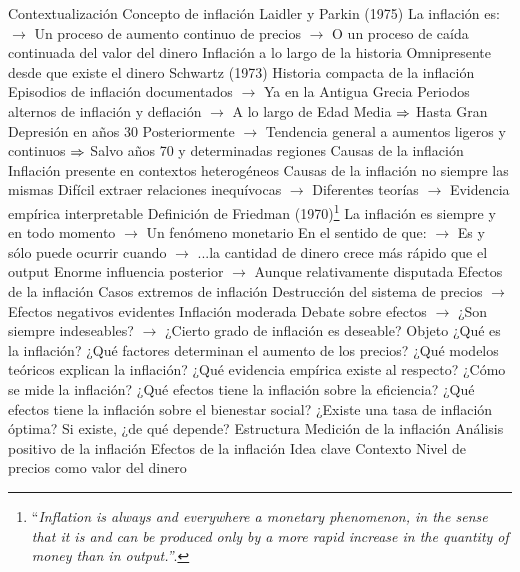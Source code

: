 \documentclass{nuevotema}
\begin{document}
\begin{esquemal}
	\1[] 
		\2 Contextualización
			\3 Concepto de inflación
				\4 Laidler y Parkin (1975)
				\4[] La inflación es:
				\4[] $\to$ Un proceso de aumento continuo de precios
				\4[] $\to$ O un proceso de caída continuada del valor del dinero
			\3 Inflación a lo largo de la historia
				\4 Omnipresente desde que existe el dinero
				\4 Schwartz (1973)
				\4[] Historia compacta de la inflación
				\4 Episodios de inflación documentados
				\4[] $\to$ Ya en la Antigua Grecia
				\4 Periodos alternos de inflación y deflación
				\4[] $\to$ A lo largo de Edad Media
				\4[] $\Rightarrow$ Hasta Gran Depresión en años 30
				\4 Posteriormente
				\4[] $\to$ Tendencia general a aumentos ligeros y continuos
				\4[] $\Rightarrow$ Salvo años 70 y determinadas regiones
			\3 Causas de la inflación
				\4 Inflación presente en contextos heterogéneos
				\4[] Causas de la inflación no siempre las mismas
				\4[] Difícil extraer relaciones inequívocas
				\4[] $\to$ Diferentes teorías
				\4[] $\to$ Evidencia empírica interpretable
				\4 Definición de Friedman (1970)\footnote{``\textit{Inflation is always and everywhere a monetary phenomenon, in the sense that it is and can be produced only by a more rapid increase in the quantity of money than in output.''}.}
				\4[] La inflación es siempre y en todo momento
				\4[] $\to$ Un fenómeno monetario
				\4[] En el sentido de que:
				\4[] $\to$ Es y sólo puede ocurrir cuando
				\4[] $\to$ ...la cantidad de dinero crece más rápido que el output
				\4[] Enorme influencia posterior
				\4[] $\to$ Aunque relativamente disputada
			\3 Efectos de la inflación
				\4 Casos extremos de inflación
				\4[] Destrucción del sistema de precios
				\4[] $\to$ Efectos negativos evidentes
				\4 Inflación moderada
				\4[] Debate sobre efectos
				\4[] $\to$ ¿Son siempre indeseables?
				\4[] $\to$ ¿Cierto grado de inflación es deseable?
		\2 Objeto
			\3 ¿Qué es la inflación?
			\3 ¿Qué factores determinan el aumento de los precios?
			\3 ¿Qué modelos teóricos explican la inflación?
			\3 ¿Qué evidencia empírica existe al respecto?
			\3 ¿Cómo se mide la inflación?
			\3 ¿Qué efectos tiene la inflación sobre la eficiencia?
			\3 ¿Qué efectos tiene la inflación sobre el bienestar social?
			\3 ¿Existe una tasa de inflación óptima?
				\4 Si existe, ¿de qué depende?
		\2 Estructura
			\3 Medición de la inflación
			\3 Análisis positivo de la inflación
			\3 Efectos de la inflación
	\1 
		\2 Idea clave
			\3 Contexto
				\4 Nivel de precios como valor del dinero

\end{esquemal}
\end{document}
